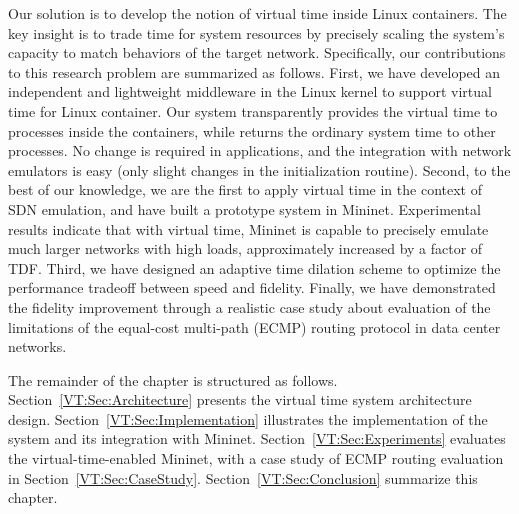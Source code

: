 Our solution is to develop the notion of virtual time inside Linux containers.
The key insight is to trade time for system resources by precisely scaling the system's capacity to match behaviors of the target network.
Specifically, our contributions to this research problem are summarized as follows. 
First, we have developed an independent and lightweight middleware in the Linux kernel to support virtual time for Linux container. 
Our system transparently provides the virtual time to processes inside the containers, while returns the ordinary system time to other processes. 
No change is required in applications, and the integration with network emulators is easy (only slight changes in the initialization routine). 
Second, to the best of our knowledge, we are the first to apply virtual time in the context of SDN emulation, and have built a prototype system in Mininet. 
Experimental results indicate that with virtual time, Mininet is capable to precisely emulate much larger networks with high loads, approximately increased by a factor of TDF. 
Third, we have designed an adaptive time dilation scheme to optimize the performance tradeoff between speed and fidelity. 
Finally, we have demonstrated the fidelity improvement through a realistic case study about evaluation of the limitations of
the equal-cost multi-path (ECMP) routing protocol in data center networks.

The remainder of the chapter is structured as follows. Section~\ref{VT:Sec:Architecture} presents the virtual time system architecture design. 
Section~\ref{VT:Sec:Implementation} illustrates the implementation of the system and its integration with Mininet.
Section~\ref{VT:Sec:Experiments} evaluates the virtual-time-enabled Mininet, with a case study of ECMP routing evaluation in Section~\ref{VT:Sec:CaseStudy}. 
Section~\ref{VT:Sec:Conclusion} summarize this chapter.

